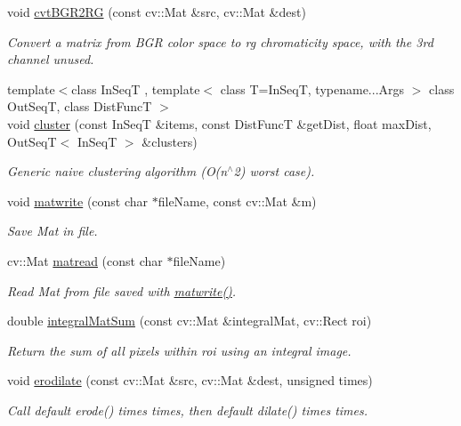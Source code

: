 \begin{DoxyCompactItemize}
void \hyperlink{namespacecvutils_afce5aa1e29332624c3f7cbabcbe19f69}{cvt\-B\-G\-R2\-R\-G} (const cv\-::\-Mat \&src, cv\-::\-Mat \&dest)
\begin{DoxyCompactList}\small\item\em Convert a matrix from B\-G\-R color space to rg chromaticity space, with the 3rd channel unused. \end{DoxyCompactList}\item 
{\footnotesize template$<$class In\-Seq\-T , template$<$ class T=\-In\-Seq\-T, typename...\-Args $>$ class Out\-Seq\-T, class Dist\-Func\-T $>$ }\\void \hyperlink{namespacecvutils_acbbf9e8cbd6decade9a79781d981d085}{cluster} (const In\-Seq\-T \&items, const Dist\-Func\-T \&get\-Dist, float max\-Dist, Out\-Seq\-T$<$ In\-Seq\-T $>$ \&clusters)
\begin{DoxyCompactList}\small\item\em Generic naive clustering algorithm ({\ttfamily O(n$^\wedge$2)} worst case). \end{DoxyCompactList}\item 
void \hyperlink{namespacecvutils_a065c3fe57f6f80cd6a4ba369f3f5a635}{matwrite} (const char $\ast$file\-Name, const cv\-::\-Mat \&m)
\begin{DoxyCompactList}\small\item\em Save Mat in file. \end{DoxyCompactList}\item 
cv\-::\-Mat \hyperlink{namespacecvutils_ad6c54561b8064273ce92dc34fd8d5c06}{matread} (const char $\ast$file\-Name)
\begin{DoxyCompactList}\small\item\em Read Mat from file saved with {\ttfamily \hyperlink{namespacecvutils_a065c3fe57f6f80cd6a4ba369f3f5a635}{matwrite()}}. \end{DoxyCompactList}\item 
double \hyperlink{namespacecvutils_a5a05bf26e8f5d1309e36ba3596618c7e}{integral\-Mat\-Sum} (const cv\-::\-Mat \&integral\-Mat, cv\-::\-Rect roi)
\begin{DoxyCompactList}\small\item\em Return the sum of all pixels within {\ttfamily roi} using an integral image. \end{DoxyCompactList}\item 
void \hyperlink{namespacecvutils_adaaa279a13adf2231b2985a5313ef446}{erodilate} (const cv\-::\-Mat \&src, cv\-::\-Mat \&dest, unsigned times)
\begin{DoxyCompactList}\small\item\em Call default {\ttfamily erode()} {\ttfamily times} times, then default {\ttfamily dilate()} {\ttfamily times} times. \end{DoxyCompactList}\item 

\end{DoxyCompactItemize}
